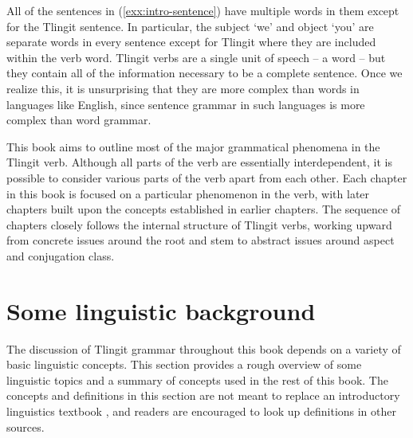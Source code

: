All of the sentences in (\ref{exx:intro-sentence}) have multiple words in them except for the Tlingit sentence.
In particular, the subject ‘we’ and object ‘you’ are separate words in every sentence except for Tlingit where they are included within the verb word.
Tlingit verbs are a single unit of speech – a word – but they contain all of the information necessary to be a complete sentence.
Once we realize this, it is unsurprising that they are more complex than words in languages like English, since sentence grammar in such languages is more complex than word grammar.

This book aims to outline most of the major grammatical phenomena in the Tlingit verb.
Although all parts of the verb are essentially interdependent, it is possible to consider various parts of the verb apart from each other.
Each chapter in this book is focused on a particular phenomenon in the verb, with later chapters built upon the concepts established in earlier chapters.
The sequence of chapters closely follows the internal structure of Tlingit verbs, working upward from concrete issues around the root and stem to abstract issues around aspect and conjugation class. 





\section{Some linguistic background}\label{sec:intro-ling}

The discussion of Tlingit grammar throughout this book depends on a variety of basic linguistic concepts.
This section provides a rough overview of some linguistic topics and a summary of concepts used in the rest of this book.
The concepts and definitions in this section are not meant to replace an introductory linguistics textbook \parencites[e.g.][]{fromkin-et-al:2000}{radford-atkinson-britain-etc:2009}{yule:2010}{fromkin-rodman-hyams:2014}{anderson:2018}, and readers are encouraged to look up definitions in other sources.


